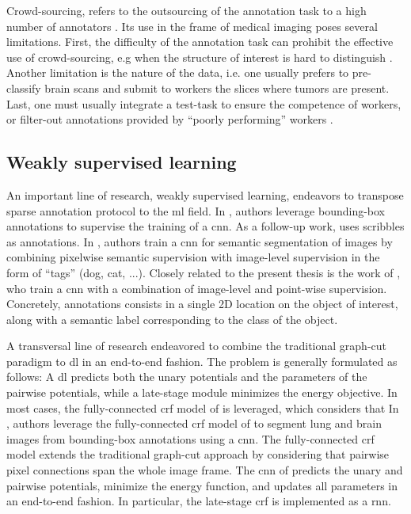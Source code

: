 Crowd-sourcing, refers to the outsourcing of the annotation task to a high number of annotators \cite{orting19}.
Its use in the frame of medical imaging poses several limitations.
First, the difficulty of the annotation task can prohibit the effective use of crowd-sourcing, e.g when the structure of interest is hard to distinguish \cite{orting19}.
Another limitation is the nature of the data, i.e. one usually prefers to pre-classify brain scans and submit to workers the slices where tumors are present.
Last, one must usually integrate a test-task to ensure the competence of workers, or filter-out annotations provided by ``poorly performing'' workers \cite{park18}.

\subsection{Weakly supervised learning}
An important line of research, weakly supervised learning, endeavors to transpose sparse annotation protocol to the \gls{ml} field.
In \cite{dai15}, authors leverage bounding-box annotations to supervise the training of a \gls{cnn}.
As a follow-up work, \cite{lin16} uses scribbles as annotations.
In \cite{papandreou15}, authors train a \gls{cnn} for semantic segmentation of images by combining pixelwise semantic supervision with image-level supervision in the form of ``tags'' (dog, cat, ...).
Closely related to the present thesis is the work of \cite{bearman16}, who train a \gls{cnn} with a combination of image-level and point-wise supervision.
Concretely, annotations consists in a single 2D location on the object of interest, along with a semantic label corresponding to the class of the object.

A transversal line of research endeavored to combine the traditional graph-cut paradigm to \gls{dl} in an end-to-end fashion.
The problem is generally formulated as follows: A \gls{dl} predicts both the unary potentials and the parameters of the pairwise potentials, while a late-stage module minimizes the energy objective.
In most cases, the fully-connected \gls{crf} model of \cite{krahenbuhl11} is leveraged, which considers that
In \cite{rajchl16}, authors leverage the fully-connected \gls{crf} model of \cite{krahenbuhl11} to segment lung and brain images from bounding-box annotations using a \gls{cnn}.
The fully-connected \gls{crf} model extends the traditional graph-cut approach by considering that pairwise pixel connections span the whole image frame.
The \gls{cnn} of \cite{rajchl16} predicts the unary and pairwise potentials, minimize the energy function, and updates all parameters in an end-to-end fashion.
In particular, the late-stage \gls{crf} is implemented as a \gls{rnn}.

